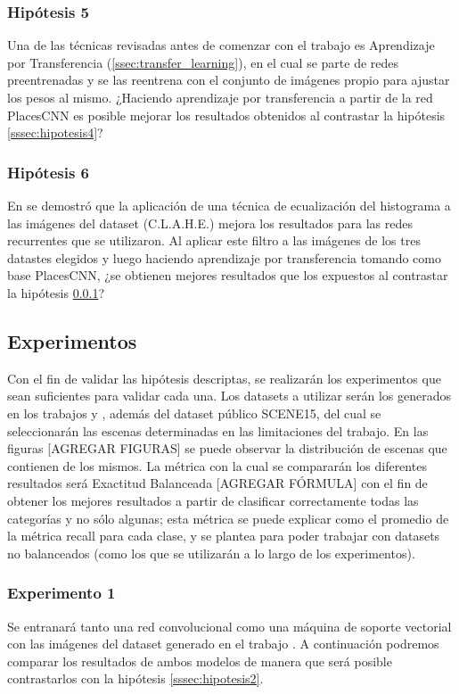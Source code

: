 \subsubsection{Hipótesis 5} \label{sssec:hipotesis5}
Una de las técnicas revisadas antes de comenzar con el trabajo es Aprendizaje por Transferencia (\ref{ssec:transfer_learning}), en el cual se parte de redes preentrenadas y se las reentrena con el conjunto de imágenes propio para ajustar los pesos al mismo. ¿Haciendo aprendizaje por transferencia a partir de la red PlacesCNN es posible mejorar los resultados obtenidos al contrastar la hipótesis \ref{sssec:hipotesis4}?

\subsubsection{Hipótesis 6} \label{sssec:hipotesis6}
En \cite{lstm_real_estate} se demostró que la aplicación de una técnica de ecualización del histograma a las imágenes del dataset (C.L.A.H.E.) mejora los resultados para las redes recurrentes que se utilizaron. Al aplicar este filtro a las imágenes de los tres datastes elegidos y luego haciendo aprendizaje por transferencia tomando como base PlacesCNN, ¿se obtienen mejores resultados que los expuestos al contrastar la hipótesis \ref{sssec:hipotesis5}?


\subsection{Experimentos}
Con el fin de validar las hipótesis descriptas, se realizarán los experimentos que sean suficientes para validar cada una. Los datasets a utilizar serán los generados en los trabajos \cite{vision_based_real_estate_price_estimation} y \cite{lstm_real_estate}, además del dataset público SCENE15, del cual se seleccionarán las escenas determinadas en las limitaciones del trabajo. En las figuras [AGREGAR FIGURAS] se puede observar la distribución de escenas que contienen de los mismos. La métrica con la cual se compararán los diferentes resultados será Exactitud Balanceada [AGREGAR FÓRMULA] con el fin de obtener los mejores resultados a partir de clasificar correctamente todas las categorías y no sólo algunas; esta métrica se puede explicar como el promedio de la métrica recall para cada clase, y se plantea para poder trabajar con datasets no balanceados (como los que se utilizarán a lo largo de los experimentos).

\subsubsection{Experimento 1} \label{sssec:exp1}
Se entranará tanto una red convolucional como una máquina de soporte vectorial con las imágenes del dataset generado en el trabajo \cite{vision_based_real_estate_price_estimation}. A continuación podremos comparar los resultados de ambos modelos de manera que será posible contrastarlos con la hipótesis \ref{sssec:hipotesis2}.

